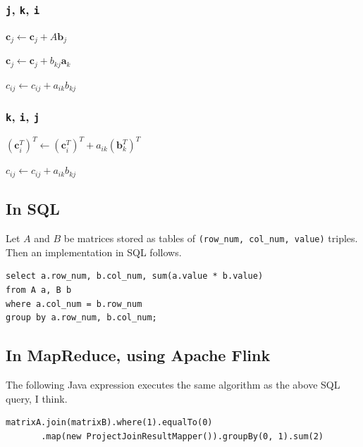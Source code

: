 \documentclass{scrartcl}
\begin{document}
\subsubsection*{\texttt{j}, \texttt{k}, \texttt{i}}
\begin{algorithmic}
  \State \(\mathbf{c}_j \gets \mathbf{c}_j + A\mathbf{b}_j\)
  \EndFor
\end{algorithmic}
\begin{algorithmic}
  \State \(\mathbf{c}_j \gets \mathbf{c}_j + b_{kj}\mathbf{a}_k\)
  \EndFor
  \EndFor
\end{algorithmic}
\begin{algorithmic}
  \State \(c_{ij} \gets c_{ij} + a_{ik}b_{kj}\)
  \EndFor
  \EndFor
  \EndFor
\end{algorithmic}

\subsubsection*{\texttt{k}, \texttt{i}, \texttt{j}}
\begin{algorithmic}
  \State \((\mathbf{c}^T_{i})^T \gets (\mathbf{c}^T_{i})^T + a_{ik}(\mathbf{b}^T_{k})^T\)
  \EndFor
  \EndFor
\end{algorithmic}
\begin{algorithmic}
  \State \(c_{ij} \gets c_{ij} + a_{ik}b_{kj}\)
  \EndFor
  \EndFor
  \EndFor
\end{algorithmic}
\fi

\subsection*{In SQL}
Let \(A\) and \(B\) be matrices stored as tables of \texttt{(row\_num, col\_num, value)} triples.
Then an implementation in SQL follows.
\begin{verbatim}
select a.row_num, b.col_num, sum(a.value * b.value)
from A a, B b
where a.col_num = b.row_num
group by a.row_num, b.col_num;
\end{verbatim}

\subsection*{In MapReduce, using Apache Flink}
The following Java expression executes the same algorithm as the above SQL query, I think.
\begin{verbatim}
matrixA.join(matrixB).where(1).equalTo(0)
       .map(new ProjectJoinResultMapper()).groupBy(0, 1).sum(2)
\end{verbatim}
\end{document}
